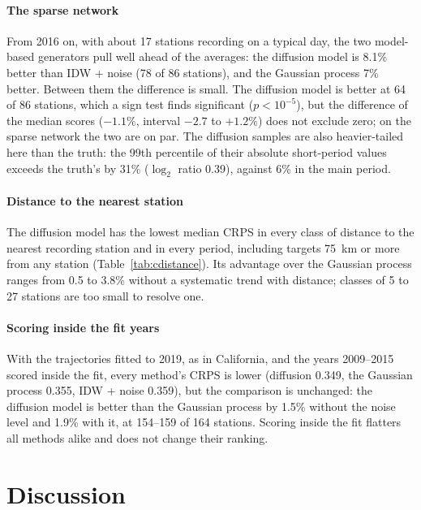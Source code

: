 \documentclass[preprint,12pt,authoryear]{elsarticle}
\begin{document}
\paragraph{The sparse network} From 2016 on, with about 17 stations recording on a
typical day, the two model-based generators pull well ahead of the averages: the
diffusion model is 8.1\% better than IDW + noise (78 of 86 stations), and the Gaussian
process 7\% better. Between them the difference is small. The diffusion model is better
at 64 of 86 stations, which a sign test finds significant ($p < 10^{-5}$), but the
difference of the median scores ($-1.1\%$, interval $-2.7$ to $+1.2\%$) does not exclude
zero; on the sparse network the two are on par. The diffusion samples are also
heavier-tailed here than the truth: the 99th percentile of their absolute short-period
values exceeds the truth's by 31\% ($\log_2$ ratio 0.39), against 6\% in the main period.

\paragraph{Distance to the nearest station} The diffusion model has the lowest median
CRPS in every class of distance to the nearest recording station and in every period,
including targets 75~km or more from any station (Table~\ref{tab:cdistance}). Its
advantage over the Gaussian process ranges from 0.5 to 3.8\% without a systematic trend
with distance; classes of 5 to 27 stations are too small to resolve one.

\paragraph{Scoring inside the fit years} With the trajectories fitted to 2019, as in
California, and the years 2009--2015 scored inside the fit, every method's CRPS is lower
(diffusion 0.349, the Gaussian process 0.355, IDW + noise 0.359), but the comparison is
unchanged: the diffusion model is better than the Gaussian process by 1.5\% without the
noise level and 1.9\% with it, at 154--159 of 164 stations. Scoring inside the fit
flatters all methods alike and does not change their ranking.

\FloatBarrier
\section{Discussion}
\label{sec:discussion}
\end{document}
